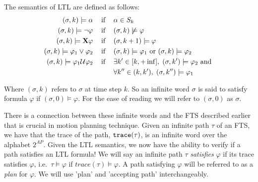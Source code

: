 \theoremstyle{definition}
\begin{definition}
\label{defLTLS}
The semantics of LTL are defined as follows:
\begin{align*}
(\sigma,k) \models \alpha \hspace{0.3cm}\text{ if }\hspace{0.3cm}& \alpha \in S_k \\
(\sigma,k) \models \neg \varphi \hspace{0.3cm}\text{ if }\hspace{0.3cm}& (\sigma, k) \not \models \varphi \\
(\sigma,k) \models \textbf{X} \varphi \hspace{0.3cm}\text{ if }\hspace{0.3cm}& (\sigma, k+1) \models \varphi \\
(\sigma,k) \models \varphi_1 \lor \varphi_2 \hspace{0.3cm}\text{ if }\hspace{0.3cm}& (\sigma,k) \models \varphi_1 \text{ or } (\sigma,k) \models \varphi_2 \\
(\sigma,k) \models \varphi_1 \mathcal{U} \varphi_2 \hspace{0.3cm}\text{ if }\hspace{0.3cm}& \exists k' \in [k,+\inf ], \hspace{0.1cm} (\sigma ,k') \models \varphi_2 \text{ and } \\ &\forall k'' \in (k,k'), \hspace{0.1cm} (\sigma, k'') \models \varphi_1 
\end{align*}
\end{definition}
Where $(\sigma,k)$  refers to $\sigma$ at time step $k$. So an infinite word $\sigma$ is said to satisfy formula $\varphi$ if $(\sigma,0) \models \varphi$. For the ease of reading we will refer to $(\sigma,0)$ as $\sigma$. 

There is a connection between these infinite words and the FTS described earlier that is crucial in motion planning technique. Given an infinite path $\tau$ of an FTS, we have that the trace of the path, $\texttt{trace}(\tau)$, is an infinite word over the alphabet $2^{AP}$. Given the LTL semantics, we now have the ability to verify if a path satisfies an LTL formula! We will say an infinite path $\tau$ \textit{satisfies} $\varphi$ if its trace satisfies $\varphi$, i.e.\ $\tau \models \varphi$ if $trace(\tau) \models \varphi$. A path satisfying $\varphi$ will be referred to as a \textit{plan} for $\varphi$. We will use 'plan' and 'accepting path' interchangeably.




